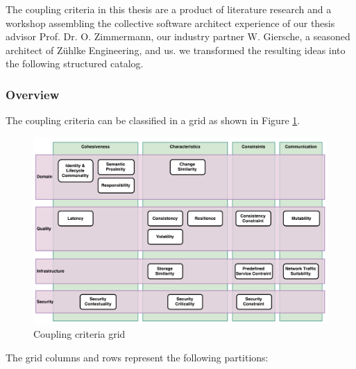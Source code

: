 The coupling criteria in this thesis are a product of literature research and a workshop assembling the collective software architect experience of our thesis advisor Prof. Dr. O. Zimmermann, our industry partner W. Giersche, a seasoned architect of Zühlke Engineering, and us. we transformed the resulting ideas into the following structured catalog.

\subsubsection{Overview}

The coupling criteria can be classified in a grid as shown in Figure \ref{fig:cc_grid}.

\begin{figure}[H]
	\includegraphics[scale=0.5]{diagrams/CouplingCatalog.pdf}
	\caption{Coupling criteria grid}
	\label{fig:cc_grid}
\end{figure}

The grid columns and rows represent the following partitions:

